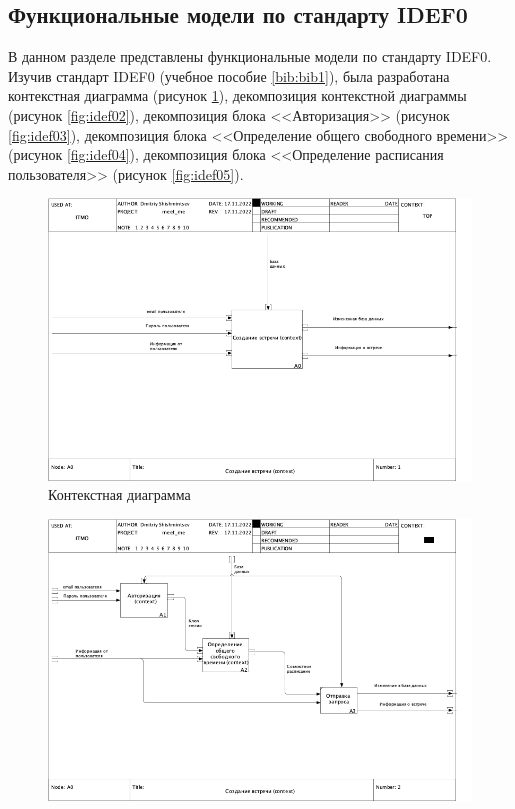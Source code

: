 \documentclass[14pt]{extreport}
\begin{document}
\subsection{Функциональные модели по стандарту IDEF0}
В данном разделе представлены функциональные модели по стандарту IDEF0. Изучив стандарт IDEF0 (учебное пособие \ref{bib:bib1}), была разработана контекстная диаграмма (рисунок \ref{fig:idef01}), декомпозиция контекстной диаграммы (рисунок \ref{fig:idef02}),  декомпозиция блока <<Авторизация>> (рисунок \ref{fig:idef03}), декомпозиция блока <<Определение общего свободного времени>> (рисунок \ref{fig:idef04}), декомпозиция блока <<Определение расписания пользователя>> (рисунок \ref{fig:idef05}).
\begin{landscape}
    \begin{figure}[h]   
        \centering
        \includegraphics[width=1\linewidth]{img/01_A0.png}
        \caption{ Контекстная диаграмма}
        \label{fig:idef01}
    \end{figure}
    \begin{figure}[h]   
        \centering
        \includegraphics[width=1\linewidth]{img/02_A0.png}

\end{figure}
\end{landscape}
\end{document}
